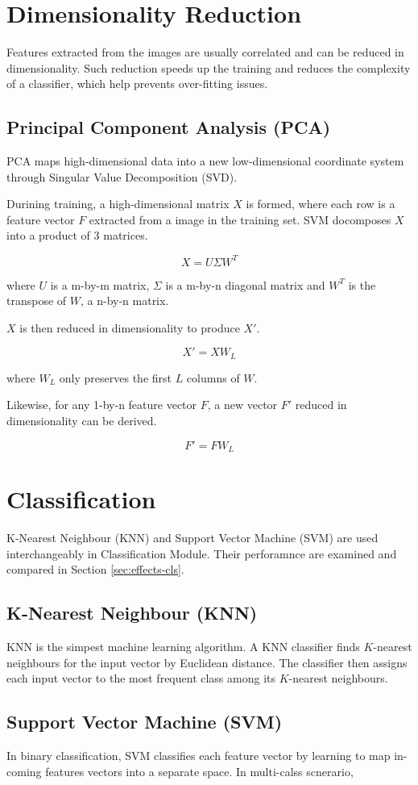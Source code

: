 \section{Dimensionality Reduction}
Features extracted from the images are usually correlated and can be reduced in dimensionality.
Such reduction speeds up the training and reduces the complexity of a classifier, which help prevents over-fitting issues.

\subsection{Principal Component Analysis (PCA)}
PCA maps high-dimensional data into a new low-dimensional coordinate system through Singular Value Decomposition (SVD).

Durining training, a high-dimensional matrix $X$ is formed, where each row is a feature vector $F$ extracted from a image in the training set.
SVM docomposes $X$ into a product of $3$ matrices.

\begin{equation}
X = U \Sigma W^T
\end{equation}

where $U$ is a m-by-m matrix, $\Sigma$ is a m-by-n diagonal matrix and $W^T$ is the transpose of $W$, a n-by-n matrix.

$X$ is then reduced in dimensionality to produce $X'$.

\begin{equation}
X' = X W_L
\end{equation}

where $W_L$ only preserves the first $L$ columns of $W$.

Likewise, for any 1-by-n feature vector $F$, a new vector $F'$ reduced in dimensionality can be derived.

\begin{equation}
F' = F W_L
\end{equation}

\section{Classification}
K-Nearest Neighbour (KNN) and Support Vector Machine (SVM) are used interchangeably in Classification Module. Their perforamnce are examined and compared in Section \ref{sec:effects-cls}.

\subsection{K-Nearest Neighbour (KNN)}
KNN is the simpest machine learning algorithm. 
A KNN classifier finds $K$-nearest neighbours for the input vector by Euclidean distance. 
The classifier then assigns each input vector to the most frequent class among its $K$-nearest neighbours.



\subsection{Support Vector Machine (SVM)}
In binary classification, SVM classifies each feature vector by learning to map in-coming features vectors into a separate space.
In multi-calss scnerario,  

